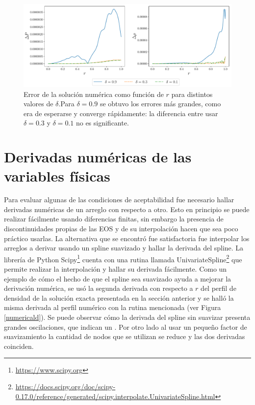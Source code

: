 \begin{figure}[H]
    \centering
    \includegraphics[width=\linewidth]{figures/ErrorTolmanVIImu45.pdf}
    \caption{Error de la solución numérica como función de $r$ para distintos valores de $\delta$.Para $\delta=0.9$ se obtuvo los errores más grandes, como era de esperarse y converge rápidamente: la diferencia entre usar $\delta=0.3$ y $\delta=0.1$ no es significante.}
    \label{ErrorExact}
\end{figure}


\section{Derivadas numéricas de las variables físicas}\label{NumDer}  

Para evaluar algunas de las condiciones de aceptabilidad fue necesario hallar derivadas numéricas de un arreglo con respecto a otro. Esto en principio se puede realizar fácilmente usando diferencias finitas, sin embargo la presencia de discontinuidades propias de las EOS y de su interpolación hacen que sea poco práctico usarlas. La alternativa que se encontró fue satisfactoria fue interpolar los arreglos a derivar usando un spline suavizado y hallar la derivada del spline. La librería de Python Scipy\footnote{\url{https://www.scipy.org}} cuenta con una rutina llamada UnivariateSpline\footnote{\url{https://docs.scipy.org/doc/scipy-0.17.0/reference/generated/scipy.interpolate.UnivariateSpline.html}} que permite realizar la interpolación y hallar su derivada fácilmente. Como un ejemplo de cómo el hecho de que el spline sea suavizado ayuda a mejorar la derivación numérica, se usó la segunda derivada con respecto a $r$ del perfil de densidad de la solución exacta presentada en la sección anterior y se halló la misma derivada al perfil numérico con la rutina mencionada (ver Figura \ref{numericald}). Se puede observar cómo la derivada del spline sin suavizar presenta grandes oscilaciones, que indican un . Por otro lado al usar un pequeño factor de suavizamiento la cantidad de nodos que se utilizan se reduce y las dos derivadas coinciden.

